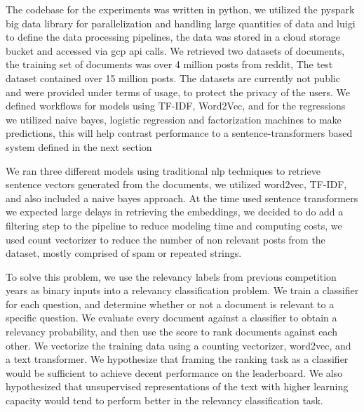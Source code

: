 \documentclass[]{style/ceurart}
\begin{document}
The codebase for the experiments was written in python,  we utilized the pyspark big data library for parallelization and handling large quantities of data and luigi to define the data processing pipelines, the data was stored in a cloud storage bucket and accessed via gcp api calls. We retrieved two datasets of documents, the training set of documents was over 4 million posts from reddit, The test dataset contained over 15 million posts. The datasets are currently not public and were provided under terms of usage, to protect the privacy of the users. We defined workflows for models using TF-IDF, Word2Vec, and for the regressions we utilized naive bayes, logistic regression and factorization machines to make predictions, this will help contrast performance to a sentence-transformers based system defined in the next section

We ran three different models using traditional nlp techniques to retrieve sentence vectors generated from the documents, we utilized word2vec, TF-IDF, and also included a naive bayes approach. At the time used sentence transformers we expected large delays in retrieving the embeddings, we decided to do add a filtering step to the pipeline to reduce modeling time and computing costs, we used count vectorizer to reduce the number of non relevant posts from the dataset, mostly comprised of spam or repeated strings.

To solve this problem, we use the relevancy labels from previous competition years as binary inputs into a relevancy classification problem. We train a classifier for each question, and determine whether or not a document is relevant to a specific question. We evaluate every document against a classifier to obtain a relevancy probability, and then use the score to rank documents against each other. We vectorize the training data using a counting vectorizer, word2vec, and a text transformer. We hypothesize that framing the ranking task as a classifier would be sufficient to achieve decent performance on the leaderboard. We also hypothesized that unsupervised representations of the text with higher learning capacity would tend to perform better in the relevancy classification task. 
\end{document}
